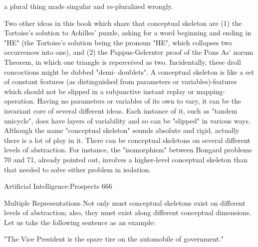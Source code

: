                   a plural thing made singular and re-pluralized wrongly.

Two other ideas in this book which share that conceptual skeleton are (1) the Tortoise's
solution to Achilles' puzzle, asking for a word beginning and ending in "HE" (the
Tortoise's solution being the pronoun "HE", which collapses two occurrences into one),
and (2) the Pappus-Gelernter proof of the Pons As' norum Theorem, in which one triangle
is reperceived as two. Incidentally, these droll concoctions might be dubbed "demi-
doublets".
        A conceptual skeleton is like a set of constant features (as distinguished from
parameters or variables)-features which should not be slipped in a subjunctive instant
replay or mapping-operation. Having no parameters or variables of its own to vary, it can
be the invariant core of several different ideas. Each instance of it, such as "tandem
unicycle", does have layers of variability and so can be "slipped" in various ways.
        Although the name "conceptual skeleton" sounds absolute and rigid, actually
there is a lot of play in it. There can be conceptual skeletons on several different levels of
abstraction. For instance, the "isomorphism" between Bongard problems 70 and 71,
already pointed out, involves a higher-level conceptual skeleton than that needed to solve
either problem in isolation.




Artificial Intelligence:Prospects                                                         666

                              Multiple Representations
Not only must conceptual skeletons exist on different levels of abstraction; also, they
must exist along different conceptual dimensions. Let us take the following sentence as
an example:

         "The Vice President is the spare tire on the automobile of government."

